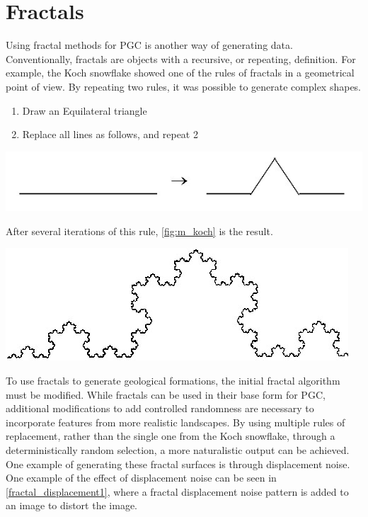 \documentclass[10pt]{report}
\begin{document}
	\vspace{10pt}
	\let\clearpage\relax
	\chapter{Fractals}
		Using fractal methods for PGC is another way of generating data. Conventionally, fractals are objects with a recursive, or repeating, definition. For example, the Koch snowflake showed one of the rules of fractals in a geometrical point of view. By repeating two rules, it was possible to generate complex shapes.
		
		\begin{enumerate}
			\item Draw an Equilateral triangle
			\item Replace all lines as follows, and repeat 2
		\end{enumerate}
	
		\begin{minipage}{\textwidth}
			\centering
			\includegraphics[scale=0.5]{m_reprule}
			\label{fig:m_reprule}
		\end{minipage}
	
		After several iterations of this rule, \autoref{fig:m_koch} is the result.
		
		\begin{minipage}{\textwidth}
			\centering
			\includegraphics[scale=0.5]{m_koch}
			\label{fig:m_koch}
		\end{minipage}
		
		To use fractals to generate geological formations, the initial fractal algorithm must be modified. While fractals can be used in their base form for PGC, additional modifications to add controlled randomness are necessary to incorporate features from more realistic landscapes. By using multiple rules of replacement, rather than the single one from the Koch snowflake, through a deterministically random selection, a more naturalistic output can be achieved. One example of generating these fractal surfaces is through displacement noise. One example of the effect of displacement noise can be seen in \autoref{fractal_displacement1}, where a fractal displacement noise pattern is added to an image to distort the image. 
		
\end{document}
